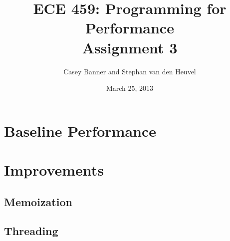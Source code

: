 \documentclass[12pt]{article}
\title{ECE 459: Programming for Performance\\Assignment 3}
\author{Casey Banner and Stephan van den Heuvel}
\date{March 25, 2013}
\begin{document}
\maketitle

\section*{Baseline Performance}

\section*{Improvements}

\subsection*{Memoization}

\subsection*{Threading}
\end{document}
